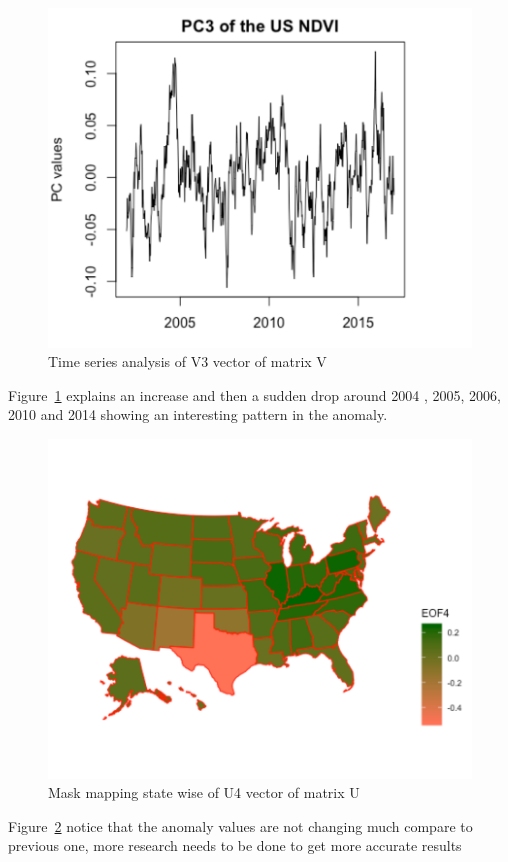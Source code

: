     \begin{figure}[H]
            \centering
            \includegraphics[width=0.70\linewidth]{figures/ch5/SVD/pc3.png}
            \caption{\label{fig:V_3} Time series analysis of V3 vector of matrix V}
    \end{figure}
    
    Figure~\ref{fig:V_3} explains an increase and then a sudden drop around 2004 , 2005, 2006, 2010 and 2014 showing an interesting pattern in the anomaly.
    
    
     \begin{figure}[H]
            \centering
            \includegraphics[width=0.70\linewidth]{figures/ch5/SVD/eof4.png}
            \caption{\label{fig:EOF_4} Mask mapping state wise of U4 vector of matrix U}
    \end{figure}
    
    Figure~\ref{fig:EOF_4} notice that the anomaly values are not changing much compare to previous one, more research needs to be done to get more accurate results
    
